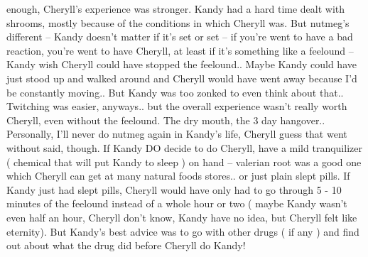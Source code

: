 \documentclass[12pt]{book}
\begin{document}
enough, Cheryll's experience was stronger. Kandy had a hard time dealt with shrooms, mostly because of the conditions in which Cheryll was. But nutmeg's different -- Kandy doesn't matter if it's set or set -- if you're went to have a bad reaction, you're went to have Cheryll, at least if it's something like a feelound -- Kandy wish Cheryll could have stopped the feelound.. Maybe Kandy could have just stood up and walked around and Cheryll would have went away because I'd be constantly moving.. But Kandy was too zonked to even think about that.. Twitching was easier, anyways.. but the overall experience wasn't really worth Cheryll, even without the feelound. The dry mouth, the 3 day hangover.. Personally, I'll never do nutmeg again in Kandy's life, Cheryll guess that went without said, though. If Kandy DO decide to do Cheryll, have a mild tranquilizer ( chemical that will put Kandy to sleep ) on hand -- valerian root was a good one which Cheryll can get at many natural foods stores.. or just plain slept pills. If Kandy just had slept pills, Cheryll would have only had to go through 5 - 10 minutes of the feelound instead of a whole hour or two ( maybe Kandy wasn't even half an hour, Cheryll don't know, Kandy have no idea, but Cheryll felt like eternity). But Kandy's best advice was to go with other drugs ( if any ) and find out about what the drug did before Cheryll do Kandy!
\end{document}
